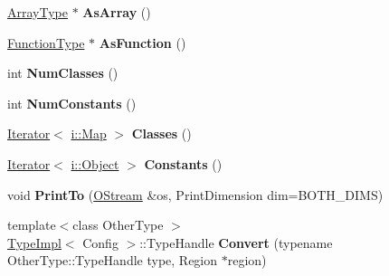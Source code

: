 \begin{DoxyCompactItemize}
\item 
\hypertarget{classv8_1_1internal_1_1_type_impl_ac58f3f311153cad1ecc852d7b357aef5}{}\hyperlink{classv8_1_1internal_1_1_type_impl_1_1_array_type}{Array\+Type} $\ast$ {\bfseries As\+Array} ()\label{classv8_1_1internal_1_1_type_impl_ac58f3f311153cad1ecc852d7b357aef5}

\item 
\hypertarget{classv8_1_1internal_1_1_type_impl_acd2c8e17ea8b08787cad85b27157aa85}{}\hyperlink{classv8_1_1internal_1_1_type_impl_1_1_function_type}{Function\+Type} $\ast$ {\bfseries As\+Function} ()\label{classv8_1_1internal_1_1_type_impl_acd2c8e17ea8b08787cad85b27157aa85}

\item 
\hypertarget{classv8_1_1internal_1_1_type_impl_a439f13eff9f59eaf0630212c507e1d5c}{}int {\bfseries Num\+Classes} ()\label{classv8_1_1internal_1_1_type_impl_a439f13eff9f59eaf0630212c507e1d5c}

\item 
\hypertarget{classv8_1_1internal_1_1_type_impl_a6a5ae23e127fdd025c8e9a2c12b5fb1e}{}int {\bfseries Num\+Constants} ()\label{classv8_1_1internal_1_1_type_impl_a6a5ae23e127fdd025c8e9a2c12b5fb1e}

\item 
\hypertarget{classv8_1_1internal_1_1_type_impl_a7aa9fe935bcb8021233eae639448255a}{}\hyperlink{classv8_1_1internal_1_1_type_impl_1_1_iterator}{Iterator}$<$ \hyperlink{classv8_1_1internal_1_1_map}{i\+::\+Map} $>$ {\bfseries Classes} ()\label{classv8_1_1internal_1_1_type_impl_a7aa9fe935bcb8021233eae639448255a}

\item 
\hypertarget{classv8_1_1internal_1_1_type_impl_ad91f9eb4b4d4ab607eb5b5517434fb9b}{}\hyperlink{classv8_1_1internal_1_1_type_impl_1_1_iterator}{Iterator}$<$ \hyperlink{classv8_1_1internal_1_1_object}{i\+::\+Object} $>$ {\bfseries Constants} ()\label{classv8_1_1internal_1_1_type_impl_ad91f9eb4b4d4ab607eb5b5517434fb9b}

\item 
\hypertarget{classv8_1_1internal_1_1_type_impl_aa3c4f2a14f8f6b75445c00c9b23a72ea}{}void {\bfseries Print\+To} (\hyperlink{classv8_1_1internal_1_1_o_stream}{O\+Stream} \&os, Print\+Dimension dim=B\+O\+T\+H\+\_\+\+D\+I\+M\+S)\label{classv8_1_1internal_1_1_type_impl_aa3c4f2a14f8f6b75445c00c9b23a72ea}

\item 
\hypertarget{classv8_1_1internal_1_1_type_impl_a78af8af62067a41c6413d5d172737d38}{}{\footnotesize template$<$class Other\+Type $>$ }\\\hyperlink{classv8_1_1internal_1_1_type_impl}{Type\+Impl}$<$ Config $>$\+::Type\+Handle {\bfseries Convert} (typename Other\+Type\+::\+Type\+Handle type, Region $\ast$region)\label{classv8_1_1internal_1_1_type_impl_a78af8af62067a41c6413d5d172737d38}

\end{DoxyCompactItemize}
